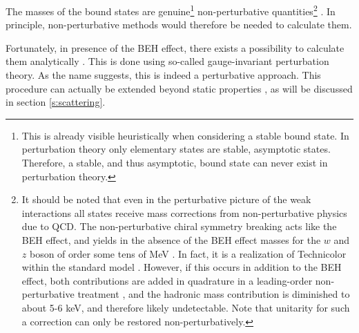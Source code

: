 \documentclass[final,twoside,12pt]{article}
\newcommand*{\1}{1\!\!\!\bot}
\begin{document}
The masses of the bound states are genuine\footnote{This is already visible heuristically when considering a stable bound state. In perturbation theory only elementary states are stable, asymptotic states. Therefore, a stable, and thus asymptotic, bound state can never exist in perturbation theory.} non-perturbative quantities\footnote{It should be noted that even in the perturbative picture of the weak interactions all states receive mass corrections from non-perturbative physics due to QCD. The non-perturbative chiral symmetry breaking acts like the BEH effect, and yields in the absence of the BEH effect masses for the $w$ and $z$ boson of order some tens of MeV \cite{Quigg:2009xr}. In fact, it is a realization of Technicolor \cite{Hill:2002ap,Morrissey:2009tf,Andersen:2011yj} within the standard model \cite{Quigg:2009xr}. However, if this occurs in addition to the BEH effect, both contributions are added in quadrature in a leading-order non-perturbative treatment \cite{Eichmann:pc}, and the hadronic mass contribution is diminished to about 5-6 keV, and therefore likely undetectable. Note that unitarity for such a correction can only be restored non-perturbatively.} \cite{Alkofer:2000wg,Hoyer:2014gna}. In principle, non-perturbative methods would therefore be needed to calculate them.

Fortunately, in presence of the BEH effect, there exists a possibility to calculate them analytically \cite{Frohlich:1980gj,Frohlich:1981yi}. This is done using so-called \cite{Seiler:2015rwa} gauge-invariant perturbation theory. As the name suggests, this is indeed a perturbative approach. This procedure can actually be extended beyond static properties \cite{Frohlich:1980gj,Frohlich:1981yi,Maas:2012ct,Egger:2017tkd}, as will be discussed in section \ref{s:scattering}.
\end{document}
